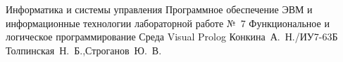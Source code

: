 \documentclass{bmstu}
\begin{document}
	\makereporttitle
	{Информатика и системы управления} %
	{Программное обеспечение ЭВМ и информационные технологии} %
	{лабораторной работе №~7} %
	{Функциональное и логическое программирование} %
	{Среда Visual Prolog} %
	{} %
	{Конкина~А.~Н./ИУ7-63Б} %
	{Толпинская~Н.~Б.,Строганов~Ю.~В.} %
\end{document}
